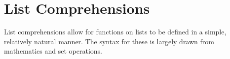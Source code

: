 \section{List Comprehensions}\label{sec:List_Comprehensions}
List comprehensions allow for functions on lists to be defined in a simple, relatively natural manner.
The syntax for these is largely drawn from mathematics and set operations.









